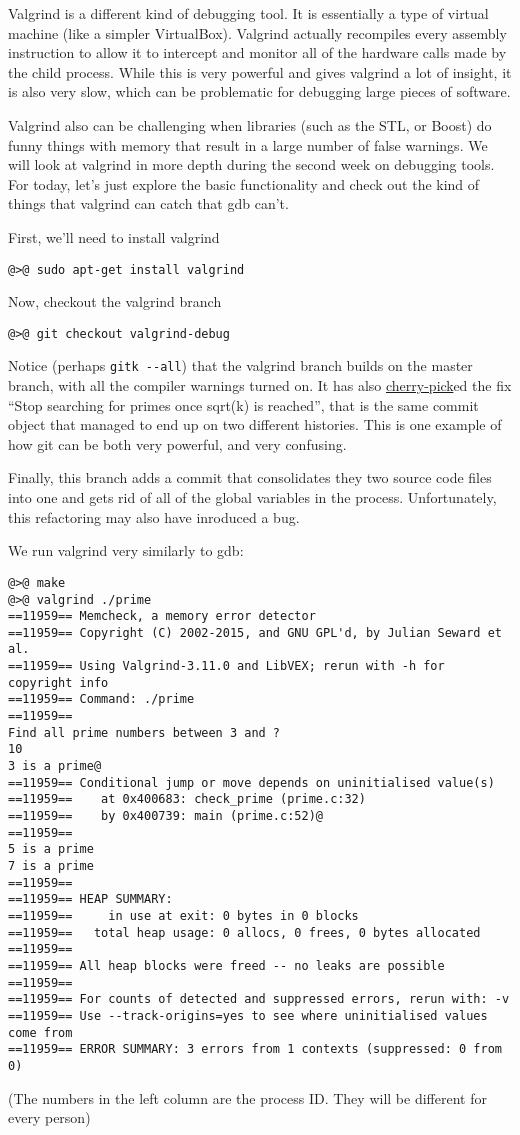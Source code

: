 \documentclass{article}
\begin{document}
Valgrind is a different kind of debugging tool. It is essentially a type of
virtual machine (like a simpler VirtualBox). Valgrind actually recompiles
every assembly instruction to allow it to intercept and monitor all of the
hardware calls made by the child process. While this is very powerful and
gives valgrind a lot of insight, it is also very slow, which can be
problematic for debugging large pieces of software.

Valgrind also can be challenging when libraries (such as the STL, or Boost) do
funny things with memory that result in a large number of false warnings. We
will look at valgrind in more depth during the second week on debugging
tools. For today, let's just explore the basic functionality and check out the
kind of things that valgrind can catch that gdb can't.

First, we'll need to install valgrind
\begin{lstlisting}
@>@ sudo apt-get install valgrind
\end{lstlisting}

Now, checkout the valgrind branch
\begin{lstlisting}
@>@ git checkout valgrind-debug
\end{lstlisting}

Notice (perhaps \texttt{gitk~-{}-all}) that the valgrind branch builds on the
master branch, with all the compiler warnings turned on. It has also
\ul{cherry-pick}ed the fix ``Stop searching for primes once sqrt(k) is
reached'', that is the same commit object that managed to end up on two
different histories.  This is one example of how git can be both very
powerful, and very confusing.

Finally, this branch adds a commit that consolidates they two source code
files into one and gets rid of all of the global variables in the process.
Unfortunately, this refactoring may also have inroduced a bug.

We run valgrind very similarly to gdb:
\begin{lstlisting}
@>@ make
@>@ valgrind ./prime
==11959== Memcheck, a memory error detector
==11959== Copyright (C) 2002-2015, and GNU GPL'd, by Julian Seward et al.
==11959== Using Valgrind-3.11.0 and LibVEX; rerun with -h for copyright info
==11959== Command: ./prime
==11959== 
Find all prime numbers between 3 and ?
10
3 is a prime@
==11959== Conditional jump or move depends on uninitialised value(s)
==11959==    at 0x400683: check_prime (prime.c:32)
==11959==    by 0x400739: main (prime.c:52)@
==11959== 
5 is a prime
7 is a prime
==11959== 
==11959== HEAP SUMMARY:
==11959==     in use at exit: 0 bytes in 0 blocks
==11959==   total heap usage: 0 allocs, 0 frees, 0 bytes allocated
==11959== 
==11959== All heap blocks were freed -- no leaks are possible
==11959== 
==11959== For counts of detected and suppressed errors, rerun with: -v
==11959== Use --track-origins=yes to see where uninitialised values come from
==11959== ERROR SUMMARY: 3 errors from 1 contexts (suppressed: 0 from 0)
\end{lstlisting}
{\small (The numbers in the left column are the process ID. They will be
  different for every person)}
\end{document}
